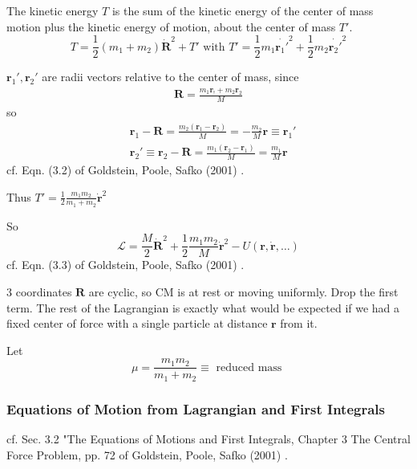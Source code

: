 The kinetic energy $T$ is the sum of the kinetic energy of the center of mass motion plus the kinetic energy of motion, about the center of mass $T'$.
\[
T = \frac{1}{2} (m_1 + m_2) \dot{ \mathbf{R}}^2 + T' \text{ with } T' = \frac{1}{2} m_1 \dot{ \mathbf{r}_1'}^2 + \frac{1}{2} m_2 \dot{\mathbf{r}_2'}^2
\]

$\mathbf{r}_1', \mathbf{r}_2'$ are radii vectors relative to the center of mass, since \\
\[
\begin{gathered}
\mathbf{R} = \frac{m_1 \mathbf{r}_! + m_2 \mathbf{r}_2 }{M}
\end{gathered}
\]
so 
\begin{equation}
\begin{aligned}
& \mathbf{r}_1 - \mathbf{R} = \frac{m_2 (\mathbf{r}_1 - \mathbf{r}_2 )}{ M} = -\frac{m_2}{M} \mathbf{r} \equiv \mathbf{r}_1' \\
&  \mathbf{r}_2' \equiv \mathbf{r}_2 - \mathbf{R} = \frac{m_1(\mathbf{r}_2 - \mathbf{r}_1 )}{ M} = \frac{m_1}{M} \mathbf{r}
\end{aligned}
\end{equation}
cf. Eqn. (3.2) of Goldstein, Poole, Safko (2001) \cite{dgdt:GPS2001}.

Thus $T' = \frac{1}{2} \frac{m_1 m_2}{m_1 + m_2 } \dot{ \mathbf{r}}^2$

So
\begin{equation}
\mathcal{L} = \frac{M}{2} \dot{\mathbf{R}}^2 + \frac{1}{2} \frac{m_1 m_2}{M} \dot{\mathbf{r}}^2 - U (\mathbf{r}, \dot{\mathbf{r}}, \dots )
\end{equation}
cf. Eqn. (3.3) of Goldstein, Poole, Safko (2001) \cite{dgdt:GPS2001}.

3 coordinates $\mathbf{R} $ are cyclic, so CM is at rest or moving uniformly. Drop the first term. The rest of the Lagrangian is exactly what would be expected if we had a fixed center of force with a single particle at distance $\mathbf{r}$ from it.

Let 
\[
\mu = \frac{m_1 m_2}{ m _1 + m_2} \equiv \text{ reduced mass }
\]

\subsubsection{Equations of Motion from Lagrangian and First Integrals}

cf. Sec. 3.2 "The Equations of Motions and First Integrals, Chapter 3 The Central Force Problem, pp. 72 of Goldstein, Poole, Safko (2001) \cite{dgdt:GPS2001}.

